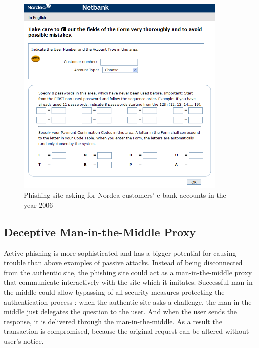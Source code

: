\documentclass{tktltiki}
\begin{document}
\begin{figure}
  \centering
  \includegraphics[width=0.9\textwidth]{images/nordea_phishing_website.png}
  \caption{Phishing site asking for Nordea customers' e-bank accounts in the year 2006}
  \label{fig:nordea_phishing_website}
\end{figure}

      
\subsection{Deceptive Man-in-the-Middle Proxy}

    Active phishing is more sophisticated and has a bigger potential for causing trouble than above examples of passive attacks. Instead of being disconnected from the authentic site, the phishing site could act as a man-in-the-middle proxy that communicate interactively with the site which it imitates. Successful man-in-the-middle could allow bypassing of all security measures protecting the authentication process \cite{beamauth_2factor_2007, schneier_2factor_2005, why_phishing_works_06}: when the authentic site asks a challenge, the man-in-the-middle just delegates the question to the user. And when the user sends the response, it is delivered through the man-in-the-middle. As a result the transaction is compromised, because the original request can be altered without user's notice.
\end{document}
